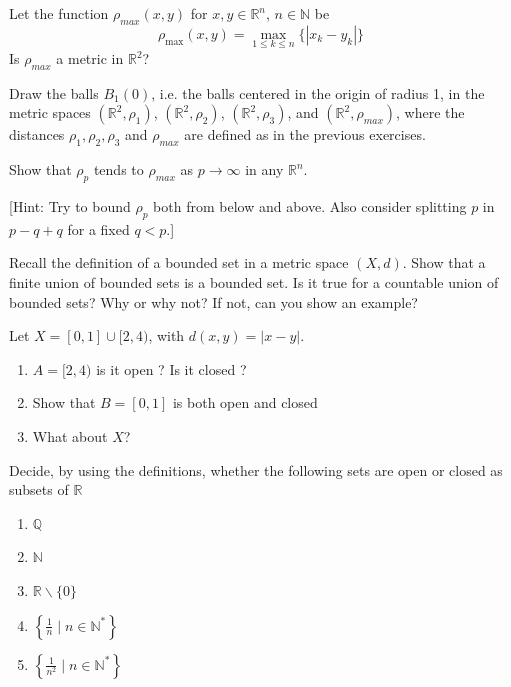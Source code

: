 \documentclass[11pt]{article}%
\newcommand{\R}{\mathbb{R}}
\newcommand{\Q}{\mathbb{Q}}
\newcommand{\N}{\mathbb{N}}
\newcommand{\bigst}{\;\Bigg|\;}
\begin{document}
\begin{Exercise}[title=*$\dagger$]
	Let the function $\rho_{max}(x,y)$ for $x,y\in\mathbb R^n$, $n\in\mathbb N$ be $$\rho_{\max}(x,y)=\max\limits_{1\leq k\leq n}\{|x_k-y_k|\}$$ Is $\rho_{max}$ a metric in $\mathbb R^2$?
\end{Exercise}

\begin{Exercise}[title=*]
	Draw the balls $B_1(0)$, i.e. the balls centered in the origin of radius 1, in the metric spaces $(\mathbb R^2,\rho_1)$, $(\mathbb R^2,\rho_2)$, $(\mathbb R^2,\rho_3)$, and $(\mathbb R^2,\rho_{max})$, where the distances $\rho_1, \rho_2,\rho_3$ and $\rho_{max}$ are defined as in the previous exercises.
\end{Exercise}

\begin{Exercise}[title=***]
	Show that $\rho_p$ tends to $\rho_{max}$ as $p\to\infty$ in any $\mathbb R^n$.
	
	[Hint: Try to bound $\rho_p$ both from below and above. Also consider splitting $p$ in $p-q+q$ for a fixed $q<p$.]
\end{Exercise}

\begin{Exercise}[title=*]
	Recall the definition of a bounded set in a metric space $(X,d)$. Show that a finite union of bounded sets is a bounded set. Is it true for a countable union of bounded sets? Why or why not? If not, can you show an example?
\end{Exercise}

\begin{Exercise}[title=*$\dagger$]
	 Let $X=[0,1]\cup[2,4)$, with $d(x,y)=|x-y|$.
	\begin{enumerate}[label={\alph*)}]
		\item $A=[2,4)$ is it open ? Is it closed ?
		\item Show that $B=[0,1]$ is both open and closed
		\item What about $X$?
	\end{enumerate}
\end{Exercise}

\begin{Exercise}[title=*$\dagger$]
	Decide, by using the definitions, whether the following sets are open or closed as subsets of $\mathbb R$
	\begin{enumerate}[label={\alph*)}]
		\item $\Q$
		\item $\N$
		\item $\R \backslash \{0\}$
		\item $\left\{\frac{1}{n}\bigst n\in\N^\ast\right\}$
		\item $\left\{\frac{1}{n^2}\bigst n\in\N^\ast\right\}$
	\end{enumerate}
\end{Exercise}
\end{document}
